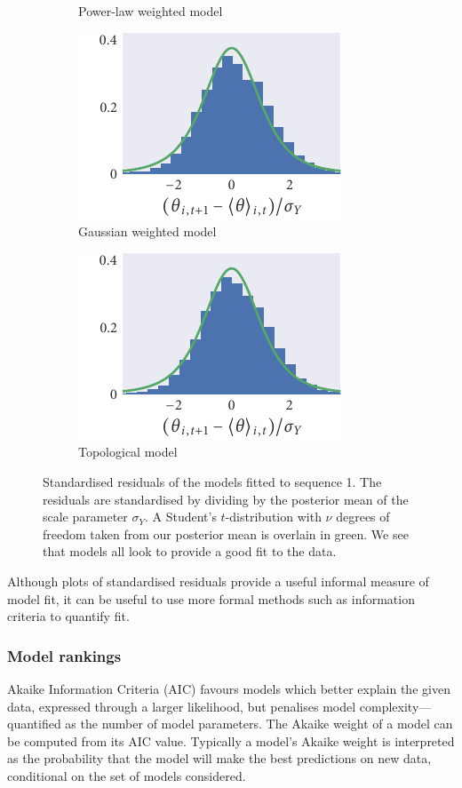 \begin{figure}[tbb]
\begin{subfigure}[t]{0.33333\textwidth}
    \caption{Power-law weighted model}
  \end{subfigure}%
  \begin{subfigure}[t]{0.33333\textwidth}
    \includegraphics{seq1/gauss_residuals.pdf}
    \caption{Gaussian weighted model}
  \end{subfigure}%
  \begin{subfigure}[t]{0.33333\textwidth}
    \includegraphics{seq1/top_residuals.pdf}
    \caption{Topological model}
  \end{subfigure}
  \caption{Standardised residuals of the models fitted to sequence 1. The
  residuals are standardised by dividing by the posterior mean of the scale
  parameter $\sigma_Y$. A Student's $t$-distribution with $\nu$ degrees of
  freedom taken from our posterior mean is overlain in green. We see that
  models all look to provide a good fit to the data.}
  \label{fig:residuals_seq1}
\end{figure}

Although plots of standardised residuals provide a useful informal measure of
model fit, it can be useful to use more formal methods such as information
criteria to quantify fit.

\subsubsection{Model rankings}

Akaike Information Criteria (AIC) favours models which better explain the
given data, expressed through a larger likelihood, but penalises model
complexity---quantified as the number of model parameters. The Akaike weight of
a model can be computed from its AIC value. Typically a model's Akaike weight is
interpreted as the probability that the model will make the best predictions on
new data, conditional on the set of models considered.

